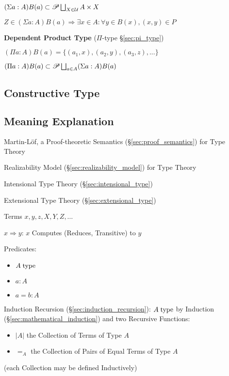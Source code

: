 $(\Sigma a:A) B(a) \subset \mathscr{P} \bigsqcup_{X \in \mathcal{U}} A \times X$

$Z \in (\Sigma a:A) B(a) \Rightarrow \exists x \in A : \forall y \in
B(x), (x,y) \in P$



\textbf{Dependent Product Type} ($\Pi$-type \S\ref{sec:pi_type})

$(\Pi a:A) B(a) = \{(a_1, x), (a_2, y), (a_3, z), ...\}$

$(\Pi a:A) B(a) \subset \mathscr{P} \bigsqcup_{a \in A} (\Sigma a:A) B(a)$


\asterism



\subsection{Constructive Type}\label{sec:constructive_type}

\subsection{Meaning Explanation}\label{sec:meaning_explanation}

Martin-L\"of, a Proof-theoretic Semantics
(\S\ref{sec:proof_semantics}) for Type Theory

Realizability Model (\S\ref{sec:realizability_model}) for Type Theory

Intensional Type Theory (\S\ref{sec:intensional_type})

Extensional Type Theory (\S\ref{sec:extensional_type})

Terms $x,y,z,X,Y,Z,\ldots$

$x \Rightarrow y$: $x$ Computes (Reduces, Transitive) to $y$

Predicates:
\begin{itemize}
  \item $A \;\mathrm{type}$
  \item $a : A$
  \item $a = b : A$
\end{itemize}

Induction Recursion (\S\ref{sec:induction_recursion}): $A \;\mathrm{type}$ by
Induction (\S\ref{sec:mathematical_induction}) and two Recursive
Functions:
\begin{itemize}
  \item $|A|$ the Collection of Terms of Type $A$
  \item $=_A$ the Collection of Pairs of Equal Terms of Type $A$
\end{itemize}
(each Collection may be defined Inductively)



